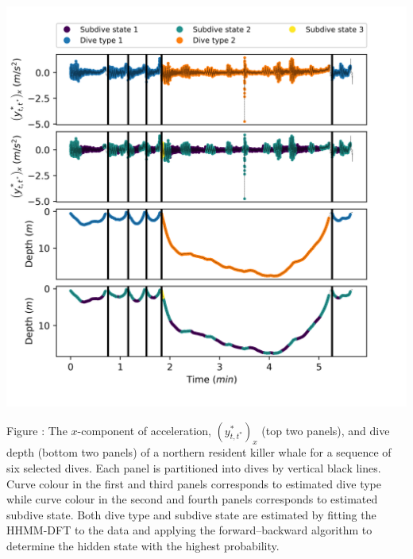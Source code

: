 \documentclass{article}
\begin{document}
        \begin{center}
        \includegraphics[width=6in]{../Plots/2019/20190902-182840-CATs_OB_1_0_267_HHMM_decoded_dives.png}
        \end{center}
        
        \noindent Figure : The $x$-component of acceleration, $(y^*_{t,t^*})_x$ (top two panels), and dive depth (bottom two panels) of a northern resident killer whale for a sequence of six selected dives. Each panel is partitioned into dives by vertical black lines. Curve colour in the first and third panels corresponds to estimated dive type while curve colour in the second and fourth panels corresponds to estimated subdive state. Both dive type and subdive state are estimated by fitting the HHMM-DFT to the data and applying the forward--backward algorithm to determine the hidden state with the highest probability.
        \addtocounter{fignum}{1}
        
\end{document}
